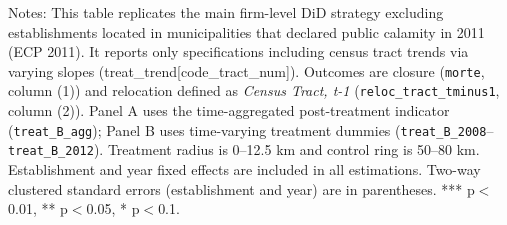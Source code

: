 \begin{table}[htb]
{\begin{threeparttable}
   	\begin{tablenotes}[flushleft] \item \small Notes: This table replicates the main firm-level DiD strategy excluding establishments located in municipalities that declared public calamity in 2011 (ECP 2011). It reports only specifications including census tract trends via varying slopes (treat\_trend[code\_tract\_num]). Outcomes are closure (\texttt{morte}, column (1)) and relocation defined as \textit{Census Tract, t-1} (\texttt{reloc\_tract\_tminus1}, column (2)). Panel A uses the time-aggregated post-treatment indicator (\texttt{treat\_B\_agg}); Panel B uses time-varying treatment dummies (\texttt{treat\_B\_2008}--\texttt{treat\_B\_2012}). Treatment radius is 0--12.5 km and control ring is 50--80 km. Establishment and year fixed effects are included in all estimations. Two-way clustered standard errors (establishment and year) are in parentheses. *** p$<$0.01, ** p$<$0.05, * p$<$0.1.
   	\end{tablenotes}
   	\end{threeparttable}
   	}
\end{table}%
